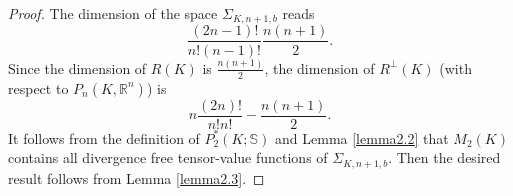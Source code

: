 \documentclass{amsart}
\numberwithin{table}{section}
\numberwithin{figure}{section}
\begin{document}
  \begin{proof} The dimension of the space $\Sigma_{K, n+1, b}$ reads
  \begin{equation}
  \frac{(2n-1)!}{n!(n-1)!}\frac{n(n+1)}{2}.
  \end{equation}
  Since the dimension of $R(K)$ is $\frac{n(n+1)}{2}$, the dimension of $R^\perp(K)$ (with respect to $P_{n}(K, \mathbb{R}^n)$) is
  \begin{equation}
  n\frac{(2n)!}{n!n!}-\frac{n(n+1)}{2}.
  \end{equation}
  It follows from the definition of $P_2^\ast(K; \mathbb{S})$ and Lemma \ref{lemma2.2} that $M_2(K)$ contains all divergence free  tensor-value functions of  $\Sigma_{K, n+1, b}$. Then the desired result follows from Lemma \ref{lemma2.3}.
  \end{proof}
\end{document}
